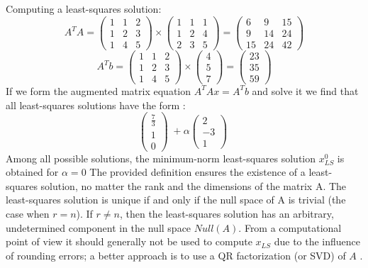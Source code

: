 \documentclass{article}
\begin{document}
				 \newline
				 \vspace{0.1cm}
Computing a least-squares solution: 
	$$ A^{T}A = \begin{pmatrix}1 & 1 & 2 \\ 1& 2 & 3 \\ 1 & 4 & 5 \end{pmatrix} 
				 \times
			 \begin{pmatrix}1 & 1 & 1 \\ 1 & 2 & 4 \\ 2 & 3 & 5 \end{pmatrix} = 
				  \begin{pmatrix}6 & 9 & 15 \\ 9 & 14 & 24 \\ 15 & 24 & 42 \end{pmatrix} $$
$$ A^{T}b = \begin{pmatrix}1 & 1 & 2 \\ 1& 2 & 3 \\ 1 & 4 & 5 \end{pmatrix} 
				 \times
			 \begin{pmatrix}  4 \\ 5 \\ 7 \end{pmatrix} = 
				  \begin{pmatrix} 23 \\ 35 \\ 59 \end{pmatrix} $$
If we form the augmented matrix equation $A^{T}Ax = A^{T}b$ and solve it we find that all least-squares solutions have the form : 
	$$ \begin{pmatrix} \frac{7}{3}\\ 1 \\ 0 \end{pmatrix} \; +\alpha \begin{pmatrix} 2\\ -3 \\ 1 \end{pmatrix} \; $$
		Among all possible solutions, the minimum-norm least-squares solution $x_{LS}^{0}$ is obtained for $\alpha = 0$
\vspace{0.1cm}
\newline
The provided definition ensures the existence of a least-squares solution, no matter the rank and the dimensions of the matrix A.
\newline
The least-squares solution is unique if and only if the null space of A is trivial (the case when $r = n$). If $r \neq n $, then the least-squares solution has an arbitrary, undetermined component in the null space $Null(A)$.
\newline
From a computational point of view it should generally not be used to compute $x_{LS}$ due to the influence of rounding errors; a better approach is to use a QR factorization (or SVD) of $A$ .
\end{document}
